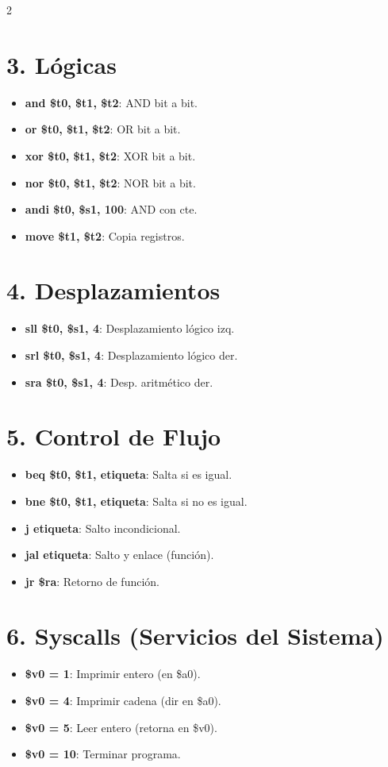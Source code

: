 \documentclass[10pt,portrait]{article}
\begin{document}
\begin{multicols}{2}
\section*{3. Lógicas}
\begin{itemize}
    \item \textbf{and \$t0, \$t1, \$t2}: AND bit a bit.
    \item \textbf{or \$t0, \$t1, \$t2}: OR bit a bit.
    \item \textbf{xor \$t0, \$t1, \$t2}: XOR bit a bit.
    \item \textbf{nor \$t0, \$t1, \$t2}: NOR bit a bit.
    \item \textbf{andi \$t0, \$s1, 100}: AND con cte.
    \item \textbf{move \$t1, \$t2}: Copia registros.
\end{itemize}

\section*{4. Desplazamientos}
\begin{itemize}
    \item \textbf{sll \$t0, \$s1, 4}: Desplazamiento lógico izq.
    \item \textbf{srl \$t0, \$s1, 4}: Desplazamiento lógico der.
    \item \textbf{sra \$t0, \$s1, 4}: Desp. aritmético der.
\end{itemize}

\section*{5. Control de Flujo}
\begin{itemize}
    \item \textbf{beq \$t0, \$t1, etiqueta}: Salta si es igual.
    \item \textbf{bne \$t0, \$t1, etiqueta}: Salta si no es igual.
    \item \textbf{j etiqueta}: Salto incondicional.
    \item \textbf{jal etiqueta}: Salto y enlace (función).
    \item \textbf{jr \$ra}: Retorno de función.
\end{itemize}

\section*{6. Syscalls (Servicios del Sistema)}
\begin{itemize}
    \item \textbf{\$v0 = 1}: Imprimir entero (en \$a0).
    \item \textbf{\$v0 = 4}: Imprimir cadena (dir en \$a0).
    \item \textbf{\$v0 = 5}: Leer entero (retorna en \$v0).
    \item \textbf{\$v0 = 10}: Terminar programa.
\end{itemize}

\end{multicols}
\end{document}
